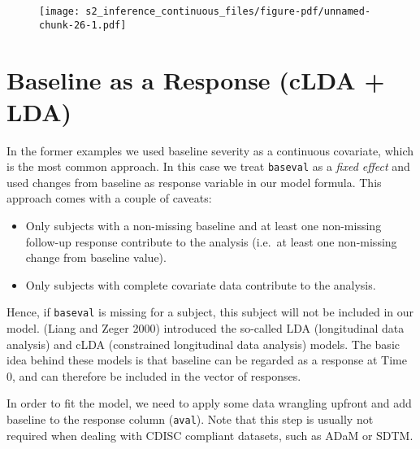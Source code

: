 \documentclass[
  letterpaper,
  DIV=11,
  numbers=noendperiod]{scrreprt}
\begin{document}
\begin{figure}[H]

{\centering \texttt{[image: s2\_inference\_continuous\_files/figure-pdf/unnamed-chunk-26-1.pdf]}

}

\end{figure}

\hypertarget{baseline-as-a-response-clda-lda}{%
\section{Baseline as a Response (cLDA +
LDA)}\label{baseline-as-a-response-clda-lda}}

In the former examples we used baseline severity as a continuous
covariate, which is the most common approach. In this case we treat
\texttt{baseval} as a \emph{fixed effect} and used changes from baseline
as response variable in our model formula. This approach comes with a
couple of caveats:

\begin{itemize}
\item
  Only subjects with a non-missing baseline and at least one non-missing
  follow-up response contribute to the analysis (i.e.~at least one
  non-missing change from baseline value).
\item
  Only subjects with complete covariate data contribute to the analysis.
\end{itemize}

Hence, if \texttt{baseval} is missing for a subject, this subject will
not be included in our model. (Liang and Zeger 2000) introduced the
so-called LDA (longitudinal data analysis) and cLDA (constrained
longitudinal data analysis) models. The basic idea behind these models
is that baseline can be regarded as a response at Time 0, and can
therefore be included in the vector of responses.

In order to fit the model, we need to apply some data wrangling upfront
and add baseline to the response column (\texttt{aval}). Note that this
step is usually not required when dealing with CDISC compliant datasets,
such as ADaM or SDTM.
\end{document}
